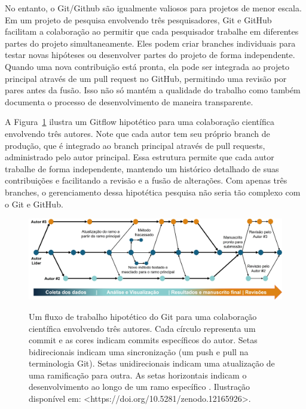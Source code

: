\documentclass[
  a4paper,
]{article}
\begin{document}
No entanto, o Git/Github são igualmente valiosos para projetos de menor
escala. Em um projeto de pesquisa envolvendo três pesquisadores, Git e
GitHub facilitam a colaboração ao permitir que cada pesquisador trabalhe
em diferentes partes do projeto simultaneamente. Eles podem criar
branches individuais para testar novas hipóteses ou desenvolver partes
do projeto de forma independente. Quando uma nova contribuição está
pronta, ela pode ser integrada ao projeto principal através de um pull
request no GitHub, permitindo uma revisão por pares antes da fusão. Isso
não só mantém a qualidade do trabalho como também documenta o processo
de desenvolvimento de maneira transparente.

A Figura~\ref{fig-git3autores} ilustra um Gitflow hipotético para uma
colaboração científica envolvendo três autores. Note que cada autor tem
seu próprio branch de produção, que é integrado ao branch principal
através de pull requests, administrado pelo autor principal. Essa
estrutura permite que cada autor trabalhe de forma independente,
mantendo um histórico detalhado de suas contribuições e facilitando a
revisão e a fusão de alterações. Com apenas três branches, o
gerenciamento dessa hipotética pesquisa não seria tão complexo com o Git
e GitHub.

\begin{figure}

\href{https://doi.org/10.5281/zenodo.12165926}{\includegraphics{img/git3autores.jpg}}

\caption{\label{fig-git3autores}Um fluxo de trabalho hipotético do Git
para uma colaboração científica envolvendo três autores. Cada círculo
representa um commit e as cores indicam commits específicos do autor.
Setas bidirecionais indicam uma sincronização (um push e pull na
terminologia Git). Setas unidirecionais indicam uma atualização de uma
ramificação para outra. As setas horizontais indicam o desenvolvimento
ao longo de um ramo específico . Ilustração disponível em:
\textless https://doi.org/10.5281/zenodo.12165926\textgreater.}

\end{figure}%
\end{document}
